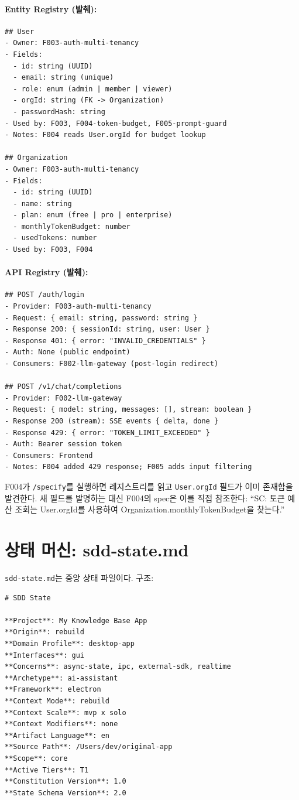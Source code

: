 \documentclass[11pt,a4paper,openright,twoside]{report}
\newcommand{\cmd}[1]{\texttt{/#1}}
\newcommand{\file}[1]{\texttt{#1}}
\begin{document}
\paragraph{Entity Registry (발췌):}
\begin{lstlisting}
## User
- Owner: F003-auth-multi-tenancy
- Fields:
  - id: string (UUID)
  - email: string (unique)
  - role: enum (admin | member | viewer)
  - orgId: string (FK -> Organization)
  - passwordHash: string
- Used by: F003, F004-token-budget, F005-prompt-guard
- Notes: F004 reads User.orgId for budget lookup

## Organization
- Owner: F003-auth-multi-tenancy
- Fields:
  - id: string (UUID)
  - name: string
  - plan: enum (free | pro | enterprise)
  - monthlyTokenBudget: number
  - usedTokens: number
- Used by: F003, F004
\end{lstlisting}

\paragraph{API Registry (발췌):}
\begin{lstlisting}
## POST /auth/login
- Provider: F003-auth-multi-tenancy
- Request: { email: string, password: string }
- Response 200: { sessionId: string, user: User }
- Response 401: { error: "INVALID_CREDENTIALS" }
- Auth: None (public endpoint)
- Consumers: F002-llm-gateway (post-login redirect)

## POST /v1/chat/completions
- Provider: F002-llm-gateway
- Request: { model: string, messages: [], stream: boolean }
- Response 200 (stream): SSE events { delta, done }
- Response 429: { error: "TOKEN_LIMIT_EXCEEDED" }
- Auth: Bearer session token
- Consumers: Frontend
- Notes: F004 added 429 response; F005 adds input filtering
\end{lstlisting}

F004가 \cmd{specify}를 실행하면 레지스트리를 읽고 \texttt{User.orgId} 필드가 이미 존재함을 발견한다. 새 필드를 발명하는 대신 F004의 spec은 이를 직접 참조한다: ``SC: 토큰 예산 조회는 User.orgId를 사용하여 Organization.monthlyTokenBudget을 찾는다.''

\section{상태 머신: sdd-state.md}

\file{sdd-state.md}는 중앙 상태 파일이다. 구조:

\begin{lstlisting}[title={sdd-state.md Header Structure}]
# SDD State

**Project**: My Knowledge Base App
**Origin**: rebuild
**Domain Profile**: desktop-app
**Interfaces**: gui
**Concerns**: async-state, ipc, external-sdk, realtime
**Archetype**: ai-assistant
**Framework**: electron
**Context Mode**: rebuild
**Context Scale**: mvp x solo
**Context Modifiers**: none
**Artifact Language**: en
**Source Path**: /Users/dev/original-app
**Scope**: core
**Active Tiers**: T1
**Constitution Version**: 1.0
**State Schema Version**: 2.0
\end{lstlisting}
\end{document}
